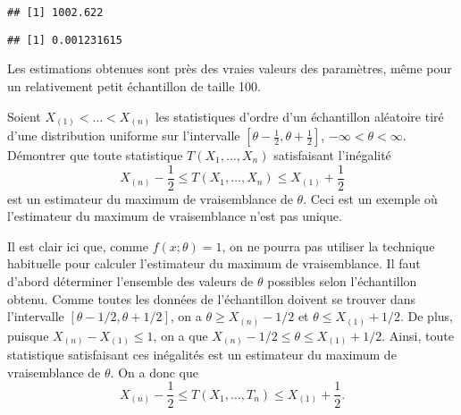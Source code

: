 \begin{exercice}
\begin{sol}
\begin{enumerate}
\begin{knitrout}
\begin{kframe}
\begin{alltt}
\end{alltt}
\begin{verbatim}
## [1] 1002.622
\end{verbatim}
\begin{alltt}
 \hlopt{/}  \hlopt{-} 
\end{alltt}
\begin{verbatim}
## [1] 0.001231615
\end{verbatim}
\end{kframe}
\end{knitrout}
      Les estimations obtenues sont près des vraies valeurs des
      paramètres, même pour un relativement petit échantillon de
      taille 100.
    \end{enumerate}
  \end{sol}
\end{exercice}

\begin{exercice}
  Soient $X_{(1)} < \dots < X_{(n)}$ les statistiques d'ordre d'un
  échantillon aléatoire tiré d'une distribution uniforme sur
  l'intervalle $[\theta - \frac{1}{2}, \theta + \frac{1}{2}]$,
  $-\infty < \theta < \infty$. Démontrer que toute statistique $T(X_1,
  \dots, X_n)$ satisfaisant l'inégalité
  \begin{displaymath}
    X_{(n)} - \frac{1}{2} \leq T(X_1, \dots, X_n) \leq
    X_{(1)} + \frac{1}{2}
  \end{displaymath}
  est un estimateur du maximum de vraisemblance de $\theta$. Ceci est
  un exemple où l'estimateur du maximum de
  vraisemblance n'est pas unique.
  \begin{sol}
    Il est clair ici que, comme $f(x;\theta) = 1$, on ne pourra pas
    utiliser la technique habituelle pour calculer l'estimateur du
    maximum de vraisemblance. Il faut d'abord déterminer l'ensemble
    des valeurs de $\theta$ possibles selon l'échantillon obtenu.
    Comme toutes les données de l'échantillon doivent se trouver dans
    l'intervalle $[\theta - 1/2, \theta + 1/2]$, on a $\theta \geq
    X_{(n)} - 1/2$ et $\theta \leq X_{(1)} + 1/2$. De plus, puisque
    $X_{(n)} - X_{(1)} \leq 1$, on a que $X_{(n)} - 1/2 \leq \theta
    \leq X_{(1)} + 1/2$. Ainsi, toute statistique satisfaisant ces
    inégalités est un estimateur du maximum de vraisemblance de
    $\theta$. On a donc que
    \begin{displaymath}
      X_{(n)} - \frac{1}{2} \leq T(X_1, \dots, T_n) \leq X_{(1)} + \frac{1}{2}.
    \end{displaymath}
  \end{sol}
\end{exercice}

